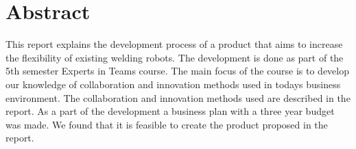 \section{Abstract}
This report explains the development process of a product that aims to increase the flexibility of existing welding robots. The development is done as part of the 5th semester Experts in Teams course. The main focus of the course is to develop our knowledge of collaboration and innovation methods used in todays business environment. The collaboration and innovation methods used are described in the report. As a part of the development a business plan with a three year budget was made. We found that it is feasible to create the product proposed in the report.